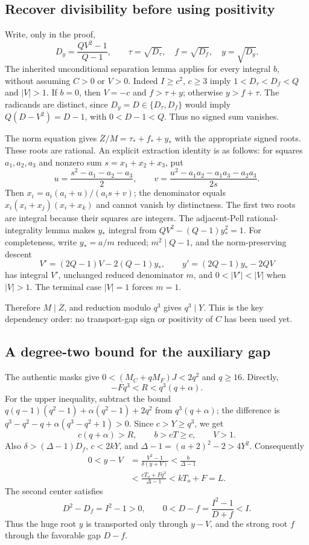\subsection{Recover divisibility before using positivity}
Write, only in the proof,
\[
 D_y=\frac{QV^2-1}{Q-1},\qquad
 \tau=\sqrt{D_\tau},\quad f=\sqrt{D_f},\quad y=\sqrt{D_y}.
\]
The inherited unconditional separation lemma applies for every integral
$b$, without assuming $C>0$ or $V>0$.  Indeed $I\ge c^2$, $c\ge3$ imply
$1<D_\tau<D_f<Q$ and $|V|>1$.  If $b=0$, then $V=-c$ and
$f>\tau+y$; otherwise $y>f+\tau$.  The radicands are distinct, since
$D_y=D\in\{D_\tau,D_f\}$ would imply $Q(D-V^2)=D-1$, with
$0<D-1<Q$.  Thus no signed sum vanishes.

The norm equation gives
$\overline Z/M=\tau_*+f_*+y_*$ with the appropriate signed roots.
These roots are rational.  An explicit extraction identity is as follows:
for squares $a_1,a_2,a_3$ and nonzero sum $s=x_1+x_2+x_3$, put
\[
 u=\frac{s^2-a_1-a_2-a_3}{2},\qquad
 v=\frac{u^2-a_1a_2-a_1a_3-a_2a_3}{2s}.
\]
Then $x_i=a_i(a_i+u)/(a_is+v)$; the denominator equals
$x_i(x_i+x_j)(x_i+x_k)$ and cannot vanish by distinctness.
The first two roots are integral because their squares are integers.
The adjacent-Pell rational-integrality lemma makes $y_*$ integral from
$QV^2-(Q-1)y_*^2=1$.  For completeness, write $y_*=a/m$ reduced;
$m^2\mid Q-1$, and the norm-preserving descent
\[
 V'=(2Q-1)V-2(Q-1)y_*,\qquad
 y'=(2Q-1)y_*-2QV
\]
has integral $V'$, unchanged reduced denominator $m$, and
$0<|V'|<|V|$ when $|V|>1$.  The terminal case $|V|=1$ forces $m=1$.

Therefore $M\mid\overline Z$, and reduction modulo $q^3$ gives
$q^3\mid Y$.  This is the key dependency order: no transport-gap sign
or positivity of $C$ has been used yet.

\subsection{A degree-two bound for the auxiliary gap}
The authentic masks give $0<(M_C+qM_F)J<2q^2$ and $q\ge16$.  Directly,
\[
 -Fq^3<R<q^3(q+\alpha).
\]
For the upper inequality, subtract the bound
$q(q-1)(q^2-1)+\alpha(q^2-1)+2q^2$ from $q^3(q+\alpha)$;
the difference is $q^3-q^2-q+\alpha(q^3-q^2+1)>0$.
Since $c>Y\ge q^3$, we get
\[
 c(q+\alpha)>R,\qquad b>cT\ge c,\qquad V>1.
\]
Also $\delta>(\Delta-1)D_f$, $c<2kY$, and
$\Delta-1=(a+2)^2-2>4Y^2$.  Consequently
\begin{align*}
 0<y-V
 &=\frac{V^2-1}{\delta(y+V)}
 <\frac{b}{\Delta-1}\\
 &<\frac{cT_o+Fq^3}{\Delta-1}<kT_o+F=L.
\end{align*}
The second center satisfies
\[
 D^2-D_f=I^2-1>0,\qquad 0<D-f=\frac{I^2-1}{D+f}<I.
\]
Thus the huge root $y$ is transported only through $y-V$, and the strong
root $f$ through the favorable gap $D-f$.

